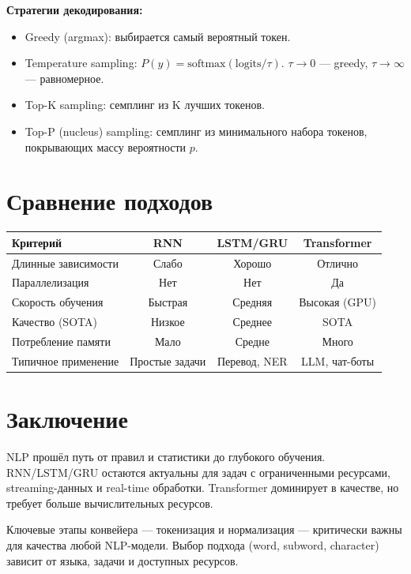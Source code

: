 \documentclass[a4paper,12pt]{article}
\begin{document}
\textbf{Стратегии декодирования:}
\begin{itemize}
    \item Greedy (argmax): выбирается самый вероятный токен.
    \item Temperature sampling: $P(y) = \text{softmax}(\text{logits} / \tau)$. $\tau \to 0$ — greedy, $\tau \to \infty$ — равномерное.
    \item Top-K sampling: семплинг из K лучших токенов.
    \item Top-P (nucleus) sampling: семплинг из минимального набора токенов, покрывающих массу вероятности $p$.
\end{itemize}

\section{Сравнение подходов}

\begin{center}
\begin{tabular}{lccc}
\toprule
\textbf{Критерий} & \textbf{RNN} & \textbf{LSTM/GRU} & \textbf{Transformer} \\
\midrule
Длинные зависимости & Слабо & Хорошо & Отлично \\
Параллелизация & Нет & Нет & Да \\
Скорость обучения & Быстрая & Средняя & Высокая (GPU) \\
Качество (SOTA) & Низкое & Среднее & SOTA \\
Потребление памяти & Мало & Средне & Много \\
Типичное применение & Простые задачи & Перевод, NER & LLM, чат-боты \\
\bottomrule
\end{tabular}
\end{center}

\section{Заключение}

NLP прошёл путь от правил и статистики до глубокого обучения. RNN/LSTM/GRU остаются актуальны для задач с ограниченными ресурсами, streaming-данных и real-time обработки. Transformer доминирует в качестве, но требует больше вычислительных ресурсов.

Ключевые этапы конвейера — токенизация и нормализация — критически важны для качества любой NLP-модели. Выбор подхода (word, subword, character) зависит от языка, задачи и доступных ресурсов.
\end{document}
